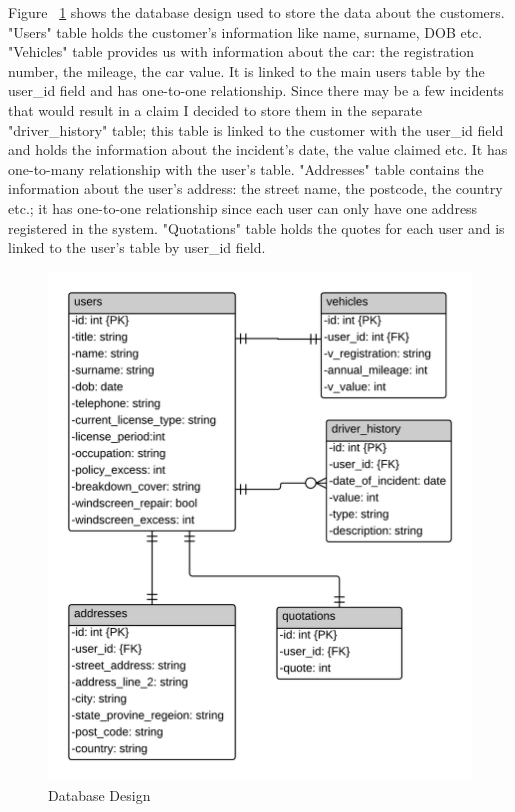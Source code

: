 \documentclass[10pt,a4paper,headinclude=true,twoside]{report}
\begin{document}
Figure ~\ref{fig:DatabaseDesign} shows the database design used to store the data about the customers. "Users" table holds the customer's information like name, surname, DOB etc. "Vehicles" table provides us with information about the car: the registration number, the mileage, the car value. It is linked to the main users table by the user\_id field and has one-to-one relationship. Since there may be a few incidents that would result in a claim I decided to store them in the separate "driver\_history" table; this table is linked to the customer with the user\_id field and holds the information about the incident's date,  the value claimed etc. It has one-to-many relationship with the user's table. "Addresses" table contains the information about the user's address: the street name, the postcode, the country etc.; it has one-to-one relationship since each user can only have one address registered in the system. "Quotations" table holds the quotes for each user and is linked to the user's table by user\_id field.    

\begin{figure}[H]
\centering
\centerline{\includegraphics[scale=0.198]{./DatabaseDesign}}
\caption{Database Design}
\label{fig:DatabaseDesign}
\end{figure}
\end{document}
